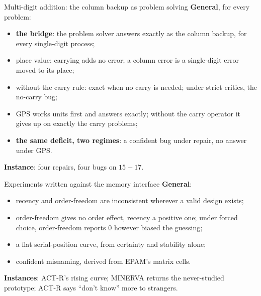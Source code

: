\documentclass[aspectratio=169,11pt]{beamer}
\begin{document}
\begin{frame}{Multi-digit addition: the column backup as problem solving}
  \small
  \textbf{General}, for every problem:
  \begin{itemize}
    \item \textbf{the bridge}: the problem solver answers exactly as the column backup, for every single-digit process;
    \item place value: carrying adds no error; a column error is a single-digit error moved to its place;
    \item without the carry rule: exact when no carry is needed; under strict critics, the no-carry bug;
    \item GPS works units first and answers exactly; without the carry operator it gives up on exactly the carry problems;
    \item \textbf{the same deficit, two regimes}: a confident bug under repair, no answer under GPS.
  \end{itemize}
  \textbf{Instance}: four repairs, four bugs on $15+17$.
\end{frame}

\begin{frame}{Experiments written against the memory interface}
  \small
  \textbf{General}:
  \begin{itemize}
    \item recency and order-freedom are inconsistent wherever a valid design exists;
    \item order-freedom gives no order effect, recency a positive one; under forced choice, order-freedom reports 0 however biased the guessing;
    \item a flat serial-position curve, from certainty and stability alone;
    \item confident misnaming, derived from EPAM's matrix cells.
  \end{itemize}
  \textbf{Instances}: ACT-R's rising curve; MINERVA returns the never-studied prototype; ACT-R says ``don't know'' more to strangers.
\end{frame}
\end{document}

